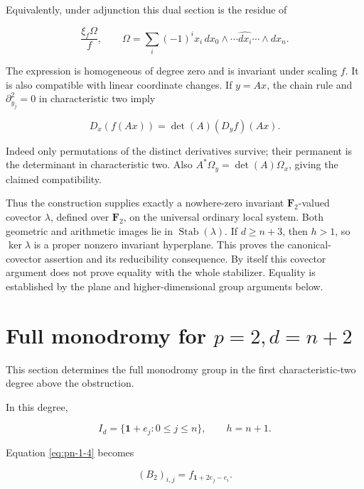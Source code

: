\documentclass[11pt]{article}
\begin{document}
Equivalently, under adjunction this dual section is the residue of

\begin{equation}
                 \frac{\xi_f\Omega}{f},\qquad
 \Omega=\sum_i(-1)^i x_i\,dx_0\wedge\cdots\widehat{dx_i}\cdots\wedge dx_n.
\end{equation}

The expression is homogeneous of degree zero and is invariant under
scaling \(f\). It is also compatible with linear coordinate changes.
If \(y=Ax\), the chain rule and \(\partial_{y_j}^2=0\) in characteristic
two imply

\begin{equation}
 D_x(f(Ax))=\det(A)(D_yf)(Ax).
\end{equation}

Indeed only permutations of the distinct derivatives survive; their
permanent is the determinant in characteristic two. Also
\(A^*\Omega_y=\det(A)\Omega_x\), giving the claimed compatibility.

Thus the construction supplies exactly a nowhere-zero invariant
\(\mathbf F_2\)-valued covector \(\lambda\), defined over \(\mathbf F_2\),
on the universal ordinary local system. Both geometric and arithmetic
images lie in \(\operatorname{Stab}(\lambda)\). If \(d\geq n+3\), then
\(h>1\), so \(\ker\lambda\) is a proper nonzero invariant hyperplane.
This proves the canonical-covector assertion and its reducibility consequence. By itself this covector argument does not prove equality with the whole stabilizer. Equality is established by the plane and higher-dimensional group arguments below.

\section{Full monodromy for \(p=2,d=n+2\)}\label{sec:pn-7}

This section determines the full monodromy group in the first characteristic-two degree above the obstruction.

In this degree,

\begin{equation}
 I_d=\{\mathbf1+e_j:0\leq j\leq n\},\qquad h=n+1.
\end{equation}

Equation \eqref{eq:pn-1-4} becomes

\begin{equation}
 (B_2)_{i,j}=f_{\mathbf1+2e_j-e_i}.                                    \label{eq:pn-7-1}
\end{equation}
\end{document}
